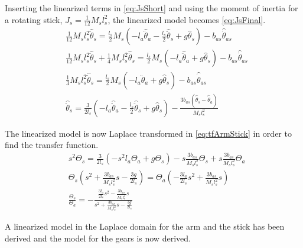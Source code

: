 Inserting the linearized terms in \autoref{eq:JsShort} and using the moment of inertia for a rotating stick, $J_s=\frac{1}{12}M_sl_s^2$, the linearized model becomes \eqref{eq:JsFinal}.
\begin{subequations}
\begin{flalign}
& \frac{1}{12}M_sl_s^2\hat{\ddot{\theta}}_s=\frac{l_s}{2}M_s\left(-l_a\hat{\ddot{\theta}}_a-\frac{l_s}{2}\hat{\ddot{\theta}}_s+g\hat{\theta}_s\right)-b_{as}\hat{\dot{\theta}}_{as}   \\
& \frac{1}{12}M_sl_s^2\hat{\ddot{\theta}}_s+\frac{1}{4}M_sl_s^2\hat{\ddot{\theta}}_s=\frac{l_s}{2}M_s\left(-l_a\hat{\ddot{\theta}}_a+g\hat{\theta}_s\right)-b_{as}\hat{\dot{\theta}}_{as}   \\
& \frac{1}{3}M_sl_s^2\hat{\ddot{\theta}}_s=\frac{l_s}{2}M_s\left(-l_a\hat{\ddot{\theta}}_a+g\hat{\theta}_s\right)-b_{as}\hat{\dot{\theta}}_{as}  \label{eq:TauSmLin} \\
& \hat{\ddot{\theta}}_s=\frac{3}{2l_s}\left(-l_a\hat{\ddot{\theta}}_a-\frac{l_s}{2}\hat{\ddot{\theta}}_s+g\hat{\theta}_s\right)-\frac{3b_{as}\left(\hat{\dot{\theta}}_s-\hat{\dot{\theta}}_a\right)}{M_sl_s^2} \label{eq:JsFinal}
\end{flalign}
\end{subequations}

The linearized model is now Laplace transformed in \autoref{eq:tfArmStick} in order to find the transfer function.
\begin{subequations}
\begin{flalign}
& s^2\Theta_s=\frac{3}{2l_s}\left(-s^2l_a\Theta_a+g\Theta_s\right)-s\frac{3b_{as}}{M_sl_s^2}\Theta_s+s\frac{3b_{as}}{M_sl_s^2}\Theta_a  \\
& \Theta_s\left(s^2+\frac{3b_{as}}{M_sl_s^2}s-\frac{3g}{2l_s}\right)=\Theta_a\left(-\frac{3l_a}{2l_s}s^2+\frac{3b_{as}}{M_sl_s^2}s\right)  \\
& \frac{\Theta_s}{\Theta_a}=-\frac{\frac{3l_a}{2l_s}s^2-\frac{3b_{as}}{M_sl_s^2}s}{s^2+\frac{3b_{as}}{M_sl_s^2}s-\frac{3g}{2l_s}} \label{eq:tfArmStick}
\end{flalign}
\end{subequations}

A linearized model in the Laplace domain for the arm and the stick has been derived and the model for the gears is now derived.
